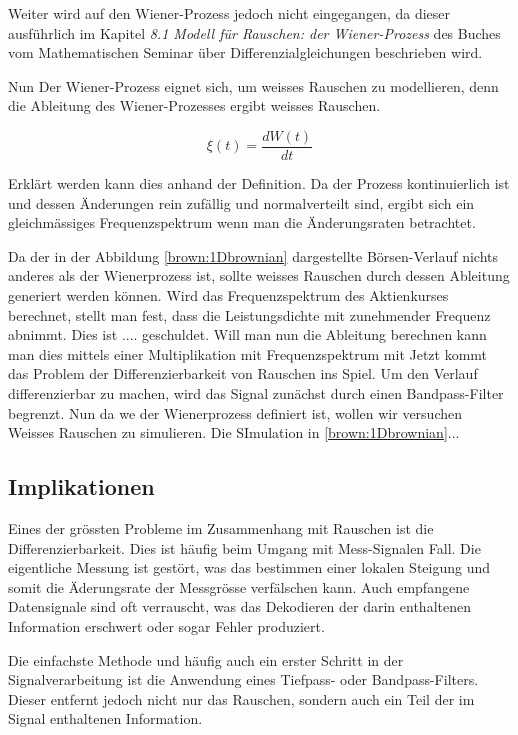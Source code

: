 Weiter wird auf den Wiener-Prozess jedoch nicht eingegangen, da dieser ausführlich im Kapitel \glqq \textit{8.1 Modell für Rauschen: der Wiener-Prozess}\glqq{} des Buches \cite{buch:mathsem-dgl} vom Mathematischen Seminar über Differenzialgleichungen beschrieben wird.

Nun Der Wiener-Prozess eignet sich, um weisses Rauschen zu modellieren, denn die Ableitung des Wiener-Prozesses ergibt weisses Rauschen.

\begin{equation}
	\xi(t) = \frac{dW(t)}{dt}
\end{equation}

Erklärt werden kann dies anhand der Definition. Da der Prozess kontinuierlich ist und dessen Änderungen rein zufällig und normalverteilt sind, ergibt sich ein gleichmässiges Frequenzspektrum wenn man die Änderungsraten betrachtet.

Da der in der Abbildung \ref{brown:1Dbrownian} dargestellte Börsen-Verlauf nichts anderes als der Wienerprozess ist, sollte weisses Rauschen durch dessen Ableitung generiert werden können. Wird das Frequenzspektrum des Aktienkurses berechnet, stellt man fest, dass die Leistungsdichte mit zunehmender Frequenz abnimmt. Dies ist .... geschuldet. Will man nun die Ableitung berechnen kann man dies mittels einer Multiplikation mit Frequenzspektrum mit 
Jetzt kommt das Problem der Differenzierbarkeit von Rauschen ins Spiel. Um den Verlauf differenzierbar zu machen, wird das Signal zunächst durch einen Bandpass-Filter begrenzt.
Nun da we der Wienerprozess definiert ist, wollen wir versuchen Weisses Rauschen zu simulieren. Die SImulation in \ref{brown:1Dbrownian}...


\subsection{Implikationen\label{brown:Rauschen:Implikationen}}

Eines der grössten Probleme im Zusammenhang mit Rauschen ist die Differenzierbarkeit. Dies ist häufig beim Umgang mit Mess-Signalen Fall. Die eigentliche Messung ist gestört, was das bestimmen einer lokalen Steigung und somit die Äderungsrate der Messgrösse verfälschen kann. Auch empfangene Datensignale sind oft verrauscht, was das Dekodieren der darin enthaltenen Information erschwert oder sogar Fehler produziert.

Die einfachste Methode und häufig auch ein erster Schritt in der Signalverarbeitung ist die Anwendung eines Tiefpass- oder Bandpass-Filters. Dieser entfernt jedoch nicht nur das Rauschen, sondern auch ein Teil der im Signal enthaltenen Information.

